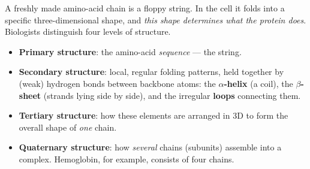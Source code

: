 \documentclass[11pt, oneside]{book}
\begin{document}
A freshly made amino-acid chain is a floppy string. In the cell it folds
into a specific three-dimensional shape, and \emph{this shape determines what
the protein does}. Biologists distinguish four levels of structure.

\begin{defbox}[title={The four levels of protein structure}]
\begin{itemize}
  \item \textbf{Primary structure}: the amino-acid \emph{sequence} --- the string.
  \item \textbf{Secondary structure}: local, regular folding patterns, held together by
    (weak) hydrogen bonds between backbone atoms: the \textbf{$\alpha$-helix}
    (a coil), the \textbf{$\beta$-sheet} (strands lying side by side), and the
    irregular \textbf{loops} connecting them.
  \item \textbf{Tertiary structure}: how these elements are arranged in 3D to form the
    overall shape of \emph{one} chain.
  \item \textbf{Quaternary structure}: how \emph{several} chains (subunits) assemble
    into a complex. Hemoglobin, for example, consists of four chains.
\end{itemize}
\end{defbox}
\end{document}
